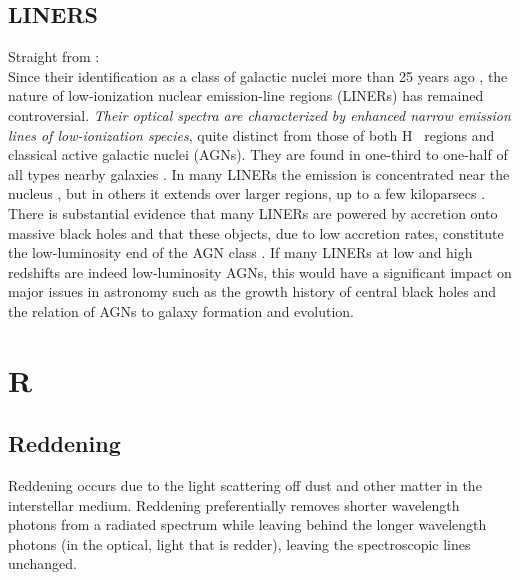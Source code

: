 \documentclass[11pt]{article}
\begin{document}
\subsection*{LINERS}
Straight from \citet{Sturm2006}:\\
Since their identification as a class of galactic nuclei more than 25
years ago \citep{Heckman1980}, the nature of low-ionization nuclear
emission-line regions (LINERs) has remained controversial. {\it Their
optical spectra are characterized by enhanced narrow emission lines of
low-ionization species}, quite distinct from those of both {H~}
regions and classical active galactic nuclei (AGNs). They are found in
one-third to one-half of all types nearby galaxies
\citep[e.g.,][]{Ho1997}. In many LINERs the emission is concentrated
near the nucleus \citep[a few times 100 pc; e.g, ][]{Pogge2000}, but
in others it extends over larger regions, up to a few kiloparsecs
\cite{Veilleux1995}.  There is substantial evidence that many LINERs
are powered by accretion onto massive black holes and that these
objects, due to low accretion rates, constitute the low-luminosity end
of the AGN class \citep[][]{Quataert2001, Kewley2006}. If many LINERs
at low and high redshifts are indeed low-luminosity AGNs, this would
have a significant impact on major issues in astronomy such as the
growth history of central black holes and the relation of AGNs to
galaxy formation and evolution.

\section*{R}
\subsection*{Reddening}
Reddening occurs due to the light scattering off dust and other matter in the interstellar medium. 
Reddening preferentially removes shorter wavelength photons from a radiated spectrum while leaving behind the longer wavelength photons (in the optical, light that is redder), leaving the spectroscopic lines unchanged.
\end{document}
